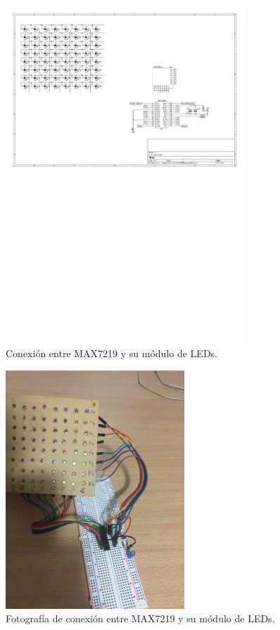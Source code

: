 \begin{figure}[ht!]
	\centering
	\begin{center}
		\includegraphics[width=0.8\textwidth]{imagenes/hw/conexion-MAX-matriz.pdf}
		\caption{Conexión entre MAX7219 y su módulo de LEDs.}
		\label{fig:MAX-matriz}
	\end{center}
\end{figure}

\begin{figure}[ht!]
	\centering
	\begin{center}
		\includegraphics[width=0.6\textwidth]{imagenes/hw/conexion-MAX-matriz.JPG}
		\caption{Fotografía de conexión entre MAX7219 y su módulo de LEDs.}
		\label{fig:MAX-matriz-real}
	\end{center}
\end{figure}


